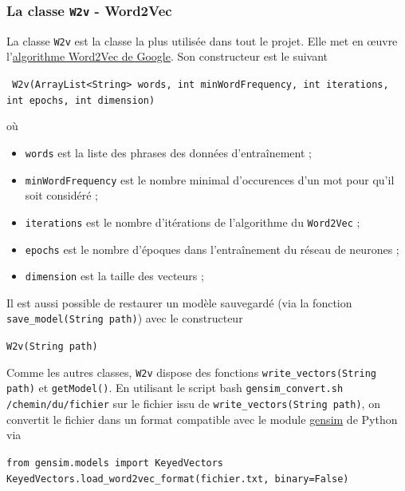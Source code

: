 \documentclass[10pt,a4paper]{article}
\newcommand\tab[1][0.5cm]{\hspace*{#1}}
\begin{document}
\subsubsection{La classe \texttt{W2v} - Word2Vec}
La classe \texttt{W2v} est la classe la plus utilisée dans tout le projet. Elle met en œuvre l'\href{https://patents.google.com/patent/US9037464B1/en}{algorithme Word2Vec de Google}. Son constructeur est le suivant
\begin{center}
	\texttt{ W2v(ArrayList<String> words, int minWordFrequency, int iterations, int epochs, int dimension)}
\end{center}
où
\begin{itemize}
	\item \texttt{words} est la liste des phrases des données d'entraînement ;
	\item \texttt{minWordFrequency} est le nombre minimal d'occurences d'un mot pour qu'il soit considéré ;
	\item \texttt{iterations} est le nombre d'itérations de l'algorithme du \texttt{Word2Vec} ;
	\item \texttt{epochs} est le nombre d'époques dans l'entraînement du réseau de neurones ;
	\item \texttt{dimension} est la taille des vecteurs ;
\end{itemize}
Il est aussi possible de restaurer un modèle sauvegardé (via la fonction \texttt{save\_model(String path)}) avec le constructeur
\begin{center}
	\texttt{W2v(String path)}
\end{center}
\tab Comme les autres classes, \texttt{W2v} dispose des fonctions \texttt{write\_vectors(String path)} et \texttt{getModel()}. En utilisant le script bash \texttt{gensim\_convert.sh /chemin/du/fichier} sur le fichier issu de \texttt{write\_vectors(String path)}, on convertit le fichier dans un format compatible avec le module \href{https://pypi.org/project/gensim/}{gensim} de Python via
\begin{center}
	\texttt{from gensim.models import KeyedVectors} \\
	\texttt{KeyedVectors.load\_word2vec\_format(fichier.txt, binary=False)}
\end{center}
\end{document}
